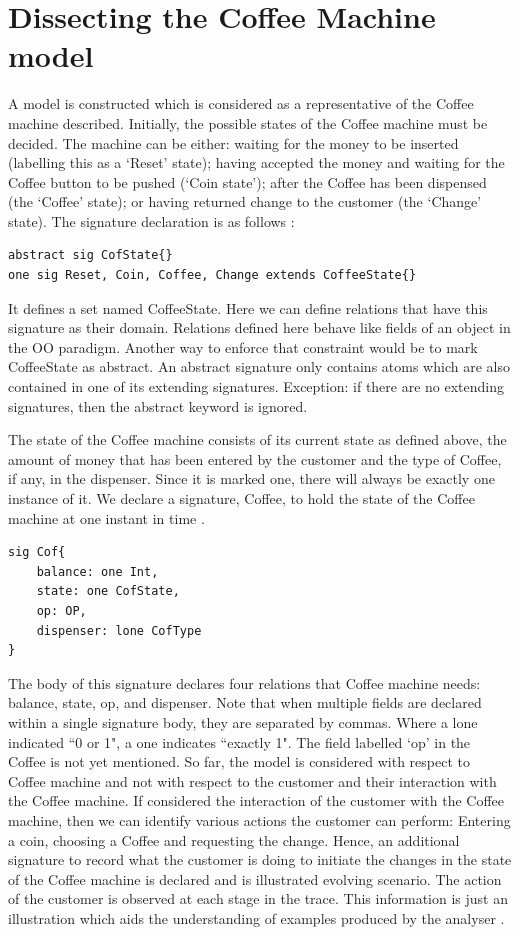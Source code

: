 \documentclass[a4paper,10pt]{report}
\begin{document}
\section{Dissecting the Coffee Machine model}
\label{Dissecting Cooffee machine}

A model is constructed which is considered as a representative of the Coffee machine described. Initially, the possible states of the Coffee machine must be decided. The machine can be either: waiting for the money to be inserted (labelling this as a `Reset’ state); having accepted the money and waiting for the Coffee button to be pushed (`Coin state’); after the Coffee has been dispensed (the ‘Coffee’ state); or having returned change to the customer (the `Change’ state). The signature declaration is as follows \cite{Boyatt}:

\begin{verbatim}
abstract sig CofState{}
one sig Reset, Coin, Coffee, Change extends CoffeeState{}
\end{verbatim}

 It defines a set named CoffeeState. Here we can define relations that have this signature as their domain. Relations defined here behave like fields of an object in the OO paradigm. Another way to enforce that constraint would be to mark CoffeeState as abstract. An abstract signature only contains atoms which are also contained in one of its extending signatures. Exception: if there are no extending signatures, then the abstract keyword is ignored.

The state of the Coffee machine consists of its current state as defined above, the amount of money that has been entered by the customer and the type of Coffee, if any, in the dispenser. Since it is marked one, there will always be exactly one instance of it. We declare a signature, Coffee, to hold the state of the Coffee machine at one instant in time \cite{Boyatt}.

\begin{verbatim}
sig Cof{
	balance: one Int,
	state: one CofState,
	op: OP,
	dispenser: lone CofType
}
\end{verbatim}

 The body of this signature declares four relations that Coffee machine needs: balance, state, op, and dispenser. Note that when multiple fields are declared within a single signature body, they are separated by commas. Where a lone indicated ``0 or 1", a one indicates ``exactly 1". The field labelled `op’ in the Coffee is not yet mentioned. So far, the model is considered with respect to Coffee machine and not with respect to the customer and their interaction with the Coffee machine. If considered the interaction of the customer with the Coffee machine, then we can identify various actions the customer can perform: Entering a coin, choosing a Coffee and requesting the change. Hence, an additional signature to record what the customer is doing to initiate the changes in the state of the Coffee machine is declared and is illustrated evolving scenario. The action of the customer is observed at each stage in the trace. This information is just an illustration which aids the understanding of examples produced by the analyser \cite{Boyatt}.
 
\end{document}
